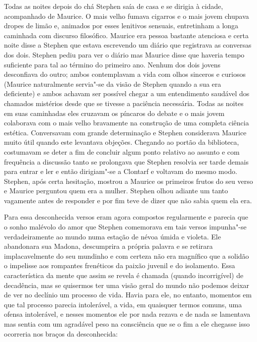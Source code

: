 Todas as noites depois do chá Stephen saía de casa e se dirigia à
cidade, acompanhado de Maurice.  O mais velho fumava cigarros e o mais
jovem chupava dropes de limão e, animados por esses lenitivos sensuais,
entretinham a longa caminhada com discurso filosófico.  Maurice era
pessoa bastante atenciosa e certa noite disse a Stephen que estava
escrevendo um diário que registrava as conversas dos dois.  Stephen
pediu para ver o diário mas Maurice disse que haveria tempo suficiente
para tal ao término do primeiro ano.  Nenhum dos dois jovens
desconfiava do outro; ambos contemplavam a vida com olhos sinceros e
curiosos (Maurice naturalmente servia"-se da visão de Stephen quando a
sua era deficiente) e ambos achavam ser possível chegar a um
entendimento saudável dos chamados mistérios desde que se tivesse a
paciência necessária.  Todas as noites em suas caminhadas eles cruzavam
os píncaros do debate e o mais jovem colaborava com o mais velho
bravamente na construção de uma completa ciência estética.  Conversavam
com grande determinação e Stephen considerava Maurice muito útil quando
este levantava objeções.  Chegando ao portão da biblioteca, costumavam
se deter a fim de concluir algum ponto relativo ao assunto e com
frequência a discussão tanto se prolongava que Stephen resolvia ser
tarde demais para entrar e ler e então dirigiam"-se a Clontarf e
voltavam do mesmo modo.  Stephen, após certa hesitação, mostrou a
Maurice os primeiros frutos do seu verso e Maurice perguntou quem era a
mulher.  Stephen olhou adiante um tanto vagamente antes de responder e
por fim teve de dizer que não sabia quem ela era.

Para essa desconhecida versos eram agora compostos regularmente e
parecia que o sonho malévolo do amor que Stephen comemorava em tais
versos impunha"-se verdadeiramente ao mundo numa estação de \label{nevoa"-umida} névoa úmida
e violeta.  Ele abandonara sua Madona, descumprira a própria palavra e
se retirara implacavelmente do seu mundinho e com certeza não era
magnífico que a solidão o impelisse aos rompantes frenéticos da paixão
juvenil e do isolamento.  Essa característica da mente que assim se
revela é chamada (quando incorrigível) de decadência, mas se quisermos
ter uma visão geral do mundo não podemos deixar de ver no
declínio um processo de vida.  Havia para ele, no entanto, momentos em
que tal processo parecia intolerável, a vida, em quaisquer termos
comuns, uma ofensa intolerável, e nesses momentos ele por nada rezava e
de nada se lamentava mas sentia com um agradável peso na consciência
que se o fim a ele chegasse isso ocorreria nos braços da desconhecida:


